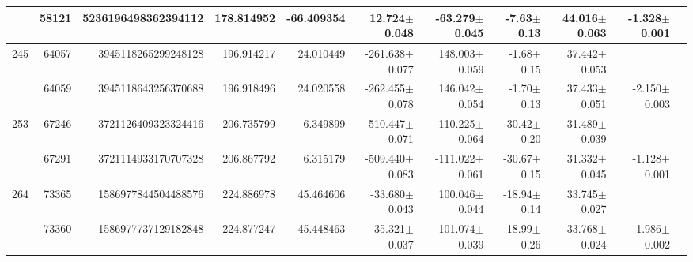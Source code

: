 \documentclass{ws-ijmpd}
\begin{document}
\begin{landscape}
\begin{longtable}{rrrrrrrrrrl}
            &   58121 &      5236196498362394112 &                   178.814952 &                   -66.409354 &                 12.724$\pm$0.048 &                -63.279$\pm$0.045 &          -7.63$\pm$  0.13 &        44.016$\pm$0.063 &                          -1.328$\pm$0.001 &                                                    \\
 \hline 245 &   64057 &      3945118265299248128 &                   196.914217 &                    24.010449 &               -261.638$\pm$0.077 &                148.003$\pm$0.059 &          -1.68$\pm$  0.15 &        37.442$\pm$0.053 &                                           &                                                    \\
            &   64059 &      3945118643256370688 &                   196.918496 &                    24.020558 &               -262.455$\pm$0.078 &                146.042$\pm$0.054 &          -1.70$\pm$  0.13 &        37.433$\pm$0.051 &                          -2.150$\pm$0.003 &                                                    \\
 \hline 253 &   67246 &      3721126409323324416 &                   206.735799 &                     6.349899 &               -510.447$\pm$0.071 &               -110.225$\pm$0.064 &         -30.42$\pm$  0.20 &        31.489$\pm$0.039 &                                           &                                                    \\
            &   67291 &      3721114933170707328 &                   206.867792 &                     6.315179 &               -509.440$\pm$0.083 &               -111.022$\pm$0.061 &         -30.67$\pm$  0.15 &        31.332$\pm$0.045 &                          -1.128$\pm$0.001 &                                                    \\
 \hline 264 &   73365 &      1586977844504488576 &                   224.886978 &                    45.464606 &                -33.680$\pm$0.043 &                100.046$\pm$0.044 &         -18.94$\pm$  0.14 &        33.745$\pm$0.027 &                                           &                                                    \\
            &   73360 &      1586977737129182848 &                   224.877247 &                    45.448463 &                -35.321$\pm$0.037 &                101.074$\pm$0.039 &         -18.99$\pm$  0.26 &        33.768$\pm$0.024 &                          -1.986$\pm$0.002 &                                                    \\

\end{longtable}
\end{landscape}
\end{document}
